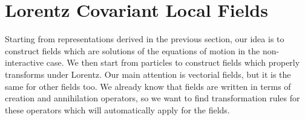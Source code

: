 \documentclass[../main.tex]{subfiles}
\begin{document}
\section{Lorentz Covariant Local Fields}
Starting from representations derived in the previous section, our idea is to construct fields which are solutions of the equations of motion in the non-interactive case. We then start from particles to construct fields which properly transforms under Lorentz. Our main attention is vectorial fields, but it is the same for other fields too. We already know that fields are written in terms of creation and annihilation operators, so we want to find transformation rules for these operators which will automatically apply for the fields.\\
\end{document}
